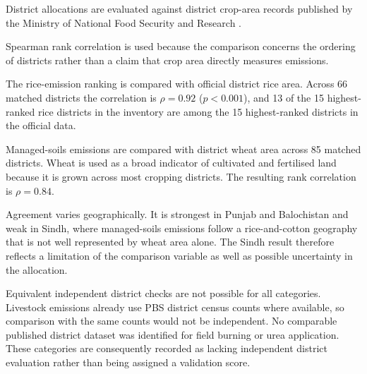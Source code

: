 District allocations are evaluated against district crop-area records published by the
Ministry of National Food Security and Research \citep{mnfsrcrops}.

Spearman rank correlation is used because the comparison concerns the ordering of districts
rather than a claim that crop area directly measures emissions.

The rice-emission ranking is compared with official district rice area. Across 66 matched
districts the correlation is $\rho=0.92$ ($p<0.001$), and 13 of the 15 highest-ranked rice
districts in the inventory are among the 15 highest-ranked districts in the official data.

Managed-soils emissions are compared with district wheat area across 85 matched districts.
Wheat is used as a broad indicator of cultivated and fertilised land because it is grown
across most cropping districts. The resulting rank correlation is $\rho=0.84$.

Agreement varies geographically. It is strongest in Punjab and Balochistan and weak in
Sindh, where managed-soils emissions follow a rice-and-cotton geography that is not well
represented by wheat area alone. The Sindh result therefore reflects a limitation of the
comparison variable as well as possible uncertainty in the allocation.

Equivalent independent district checks are not possible for all categories. Livestock
emissions already use PBS district census counts where available, so comparison with the
same counts would not be independent. No comparable published district dataset was
identified for field burning or urea application. These categories are consequently recorded
as lacking independent district evaluation rather than being assigned a validation score.

